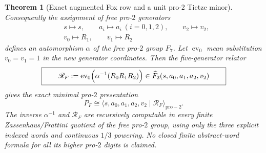 \documentclass[11pt]{article}
\newtheorem{theorem}{Theorem}[section]
\theoremstyle{definition}
\begin{document}
\begin{theorem}[Exact augmented Fox row and a unit pro-$2$ Tietze minor]
Consequently the
assignment of
free pro-$2$
generators
\begin{equation}\label{eq:dyadic-f133-nielsen-basis-change}
\boxed{
\begin{aligned}
&s\mapsto s,\qquad
a_i\mapsto a_i\ (i=0,1,2),\qquad
v_2\mapsto v_2,\\
&v_0\mapsto R_1,\qquad
v_1\mapsto R_2
\end{aligned}}
\end{equation}
defines an
\emph{automorphism}
$\alpha$ of the
free pro-$2$
group $F_7$.
Let $\operatorname{ev}_{0}$
mean substitution
$v_0=v_1=1$
in the \emph{new}
generator coordinates.
Then the five-generator
relator
\begin{equation}\label{eq:dyadic-f133-one-relator-algorithm}
\boxed{\qquad
\mathscr R_F:=
\operatorname{ev}_{0}
\Bigl(\alpha^{-1}(R_0R_1R_2)\Bigr)
\in\widehat F_{2}(s,a_0,a_1,a_2,v_2)
\qquad}
\end{equation}
gives the exact
\emph{minimal}
pro-$2$ presentation
\begin{equation}\label{eq:dyadic-f133-five-one-presentation}
\boxed{\quad
P_F\cong
\langle s,a_0,a_1,a_2,v_2
\mid \mathscr R_F\rangle_{\mathrm{pro}-2}.
\quad}
\end{equation}
The inverse
$\alpha^{-1}$
and $\mathscr R_F$
are recursively
computable in
every finite
Zassenhaus/Frattini
quotient of the
free pro-$2$
group, using
only the three
explicit indexed
words and
continuous $1/3$
powering.
No closed finite
abstract-word formula
for all its higher
pro-$2$ digits
is claimed.
\end{theorem}
\end{document}
